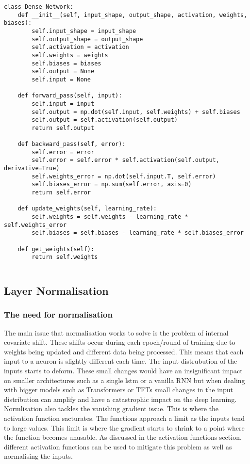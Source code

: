 \documentclass{article}
\begin{document}
\begin{lstlisting}
class Dense_Network:
    def __init__(self, input_shape, output_shape, activation, weights, biases):
        self.input_shape = input_shape
        self.output_shape = output_shape
        self.activation = activation
        self.weights = weights
        self.biases = biases
        self.output = None
        self.input = None

    def forward_pass(self, input):
        self.input = input
        self.output = np.dot(self.input, self.weights) + self.biases
        self.output = self.activation(self.output)
        return self.output

    def backward_pass(self, error):
        self.error = error
        self.error = self.error * self.activation(self.output, derivative=True)
        self.weights_error = np.dot(self.input.T, self.error)
        self.biases_error = np.sum(self.error, axis=0)
        return self.error

    def update_weights(self, learning_rate):
        self.weights = self.weights - learning_rate * self.weights_error
        self.biases = self.biases - learning_rate * self.biases_error

    def get_weights(self):
        return self.weights


\end{lstlisting}

\clearpage

\subsection{Layer Normalisation}

\subsubsection{The need for normalisation}
The main issue that normalisation works to solve is the problem of internal
covariate shift. These shifts occur during each epoch/round of training due to weights
being updated and different data being processed. This means that each input to a
neuron is slightly different each time. The input distrubution of the inputs starts
to deform.
These small changes would have an insignificant impact on smaller architectures
such as a single lstm or a vanilla RNN but when dealing with bigger models such as Transformers
or TFTs small changes in the input distribution can amplify and have a catastrophic
impact on the deep learning.
Normlisation also tackles the vanishing gradient issue. This is where the activation
function sacturates. The functions approach a limit as the inputs tend to large values.
This limit is where the gradient starts to shrink to a point where the function becomes
unusable. As discussed in the activation functions section, different activation functions
can be used to mitigate this problem as well as normalising the inputs.
\end{document}
